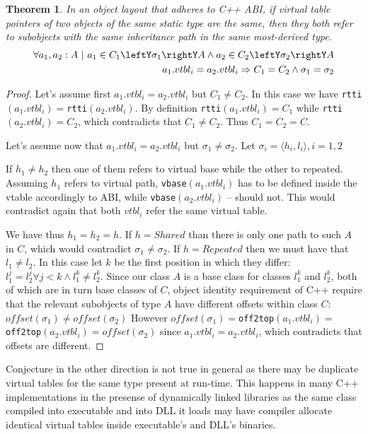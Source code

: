 \documentclass[preprint]{sigplanconf}
\makeatletter
\DeclareRobustCommand{\code}[1]{{\lstinline[breaklines=false,escapechar=@]{#1}}}
\newtheorem{theorem}{Theorem}
\makeatother
\begin{document}
\begin{theorem}
In an object layout that adheres to C++ ABI, if virtual table pointers of two 
objects of the same static type are the same, then they both refer to subobjects 
with the same inheritance path in the same most-derived type.
\begin{eqnarray*}
    \forall a_1, a_2 : A\ |\ a_1\in C_1\leftY\sigma_1\rightY A \wedge a_2\in C_2\leftY\sigma_2\rightY A \\
    a_1.vtbl_i = a_2.vtbl_i \Rightarrow C_1 = C_2 \wedge \sigma_1 = \sigma_2
\end{eqnarray*}
\label{thm:vtbl}
\end{theorem}
\begin{proof}
Let's assume first $a_1.vtbl_i = a_2.vtbl_i$ but $C_1 \neq C_2$. In this case we 
have \code{rtti}$(a_1.vtbl_i) = $\code{rtti}$(a_2.vtbl_i)$. By definition 
\code{rtti}$(a_1.vtbl_i) = C_1$ while \code{rtti}$(a_2.vtbl_i) = C_2$, which 
contradicts that $C_1 \neq C_2$. Thus $C_1 = C_2 = C$.

Let's assume now that $a_1.vtbl_i = a_2.vtbl_i$ but $\sigma_1 \neq \sigma_2$. 
Let $\sigma_i=\langle h_i,l_i\rangle,i=1,2$ 

If $h_1 \neq h_2$ then one of them refers to virtual base while the other to 
repeated. Assuming $h_1$ refers to virtual path, \code{vbase}$(a_1.vtbl_i)$ has 
to be defined inside the vtable accordingly to ABI, while 
\code{vbase}$(a_2.vtbl_i)$ -- should not. This would contradict again that both 
$vtbl_i$ refer the same virtual table.

We have thus $h_1 = h_2 = h$. If $h = Shared$ than there is only one path to 
such $A$ in $C$, which would contradict $\sigma_1 \neq \sigma_2$. 
If $h = Repeated$ then we must have that $l_1 \neq l_2$. In this case let $k$ be 
the first position in which they differ: 
$l_1^j=l_2^j \forall j<k \wedge l_1^k\neq l_2^k$. Since our class $A$ is a base 
class for classes $l_1^k$ and $l_2^k$, both of which are in turn base classes of 
$C$, object identity requirement of C++ require that the relevant subobjects of 
type $A$ have different offsets within class $C$: 
$offset(\sigma_1)\neq offset(\sigma_2)$ However 
$offset(\sigma_1)=$\code{off2top}$(a_1.vtbl_i)=$\code{off2top}$(a_2.vtbl_i)=offset(\sigma_2)$ 
since $a_1.vtbl_i = a_2.vtbl_i$, which contradicts that offsets are different.
\end{proof}

Conjecture in the other direction is not true in general as there may be 
duplicate virtual tables for the same type present at run-time. This happens in 
many C++ implementations in the presense of dynamically linked libraries as the
same class compiled into executable and into DLL it loads may have compiler 
allocate identical virtual tables inside executable's and DLL's binaries.
\end{document}
